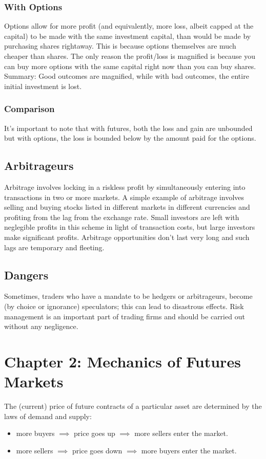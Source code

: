 \documentclass{article}
\begin{document}
\subsubsection{With Options}
Options allow for more profit (and equivalently, more loss, albeit capped at
the capital) to be made with the same investment capital,
than would be made by purchasing shares rightaway. This is because options themselves are much cheaper
than shares. The only reason the profit/loss is magnified is because you can buy more options with the
same capital right now than you can buy shares. Summary: Good outcomes are magnified, while with
bad outcomes, the entire initial investment is lost.
\subsubsection{Comparison}
It's important to note that with futures, both the loss and gain are unbounded but with options, the 
loss is bounded below by the amount paid for the options.
\subsection{Arbitrageurs}
Arbitrage involves locking in a riskless profit by simultaneously entering into transactions in two or
more markets. A simple example of arbitrage involves selling and buying stocks listed in different
markets in different currencies and profiting from the lag from the exchange rate. Small investors
are left with neglegible profits in this scheme in light of transaction costs, but large investors
make significant profits. Arbitrage opportunities don't last very long and such lags are temporary
and fleeting.
\subsection{Dangers}
Sometimes, traders who have a mandate to be hedgers or arbitrageurs, become (by
choice or ignorance) speculators; this can lead to disastrous effects. Risk management
is an important part of trading firms and should be carried out without any negligence.
\section{Chapter 2: Mechanics of Futures Markets}
The (current) price of future contracts of a particular asset are determined by the laws of demand and supply:
\begin{itemize}
    \item more buyers $\implies$ price goes up $\implies$ more sellers enter the market.
    \item more sellers $\implies$ price goes down $\implies$ more buyers enter the market.
\end{itemize}
\end{document}
